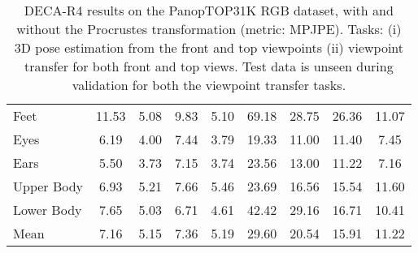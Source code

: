 \documentclass[10pt,twocolumn,letterpaper]{article}
\begin{document}
\begin{table*}[]
{\begin{tabular}{@{}lcccccccc@{}}
Feet        & 11.53                                              & 5.08                                            & 9.83                                             & 5.10                                          & 69.18                                             & 28.75                                          & 26.36                                             & 11.07                                          \\
Eyes        & 6.19                                               & 4.00                                            & 7.44                                             & 3.79                                          & 19.33                                             & 11.00                                          & 11.40                                             & 7.45                                           \\
Ears        & 5.50                                               & 3.73                                            & 7.15                                             & 3.74                                          & 23.56                                             & 13.00                                          & 11.22                                             & 7.16                                           \\
Upper Body  & 6.93                                               & 5.21                                            & 7.66                                             & 5.46                                          & 23.69                                             & 16.56                                          & 15.54                                             & 11.60                                          \\
Lower Body  & 7.65                                               & 5.03                                            & 6.71                                             & 4.61                                          & 42.42                                             & 29.16                                          & 16.71                                             & 10.41                                          \\
Mean        & 7.16                                               & 5.15                                            & 7.36                                             & 5.19                                          & 29.60                                             & 20.54                                          & 15.91                                             & 11.22                                          \\ \bottomrule
\end{tabular}}
\caption{DECA-R4 results on the PanopTOP31K RGB dataset, with and without the Procrustes transformation  \cite{goodall1991procrustes} (metric: MPJPE). Tasks: (i) 3D pose estimation from the front and top viewpoints (ii) viewpoint transfer for both front and top views. Test data is unseen during validation for both the viewpoint transfer tasks.}
\label{tab:results_rgb}
\end{table*}
\end{document}
